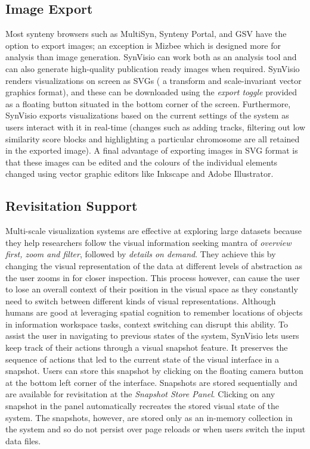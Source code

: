 \subsection{Image Export}
Most synteny browsers such as MultiSyn, Synteny Portal, and GSV\cite{baek2016multisyn,lee2016syntenyportal,revanna2011gsv} have the option to export images; an exception is Mizbee\cite{Meyer2009} which is designed more for analysis than image generation. SynVisio can work both as an analysis tool and can also generate high-quality publication ready images when required. SynVisio renders visualizations on screen as SVGs ( a transform and scale-invariant vector graphics format), and these can be downloaded using the \textit{export toggle} provided as a floating button situated in the bottom corner of the screen. Furthermore, SynVisio exports visualizations based on the current settings of the system as users interact with it in real-time (changes such as adding tracks, filtering out low similarity score blocks and highlighting a particular chromosome are all retained in the exported image). A final advantage of exporting images in SVG format is that these images can be edited and the colours of the individual elements changed using vector graphic editors like Inkscape and Adobe Illustrator.

\subsection{Revisitation Support}
Multi-scale visualization systems are effective at exploring large datasets because they help researchers follow the visual information seeking mantra of \textit{overview first, zoom and filter}, followed by \textit{details on demand}\cite{Shneiderman96theeyes}. They achieve this by changing the visual representation of the data at different levels of abstraction as the user zooms in for closer inspection\cite{Stolte}. This process however, can cause the user to lose an overall context of their position in the visual space as they constantly need to switch between different kinds of visual representations.
Although humans are good at leveraging spatial cognition to remember locations of objects in information workspace tasks\cite{datamountain}, context switching can disrupt this ability. To assist the user in navigating to previous states of the system, SynVisio lets users keep track of their actions through a visual snapshot feature. It preserves the sequence of actions that led to the current state of the visual interface in a snapshot. Users can store this snapshot by clicking on the floating camera button at the bottom left corner of the interface. Snapshots are stored sequentially and are available for revisitation at the \textit{Snapshot Store Panel}. Clicking on any snapshot in the panel automatically recreates the stored visual state of the system. The snapshots, however, are stored only as an in-memory collection in the system and so do not persist over page reloads or when users switch the input data files.


